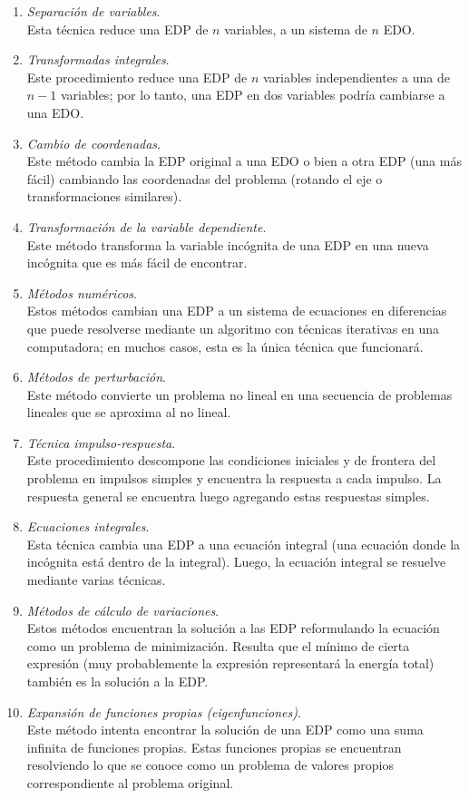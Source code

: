 \documentclass[12pt]{article}
\numberwithin{equation}{section}
\begin{document}
\begin{enumerate}
\item \emph{Separación de variables}.
\\
\bigskip
Esta técnica reduce una EDP de $n$ variables, a un sistema de $n$ EDO.
\item \emph{Transformadas integrales}. 
\\
\bigskip
Este procedimiento reduce una EDP de $n$ variables independientes a una de $n - 1$ variables; por lo tanto, una EDP en dos variables podría cambiarse a una EDO.
\item \emph{Cambio de coordenadas}.
\\
\bigskip
Este método cambia la EDP original a una EDO o bien a otra EDP (una más fácil) cambiando las coordenadas del problema (rotando el eje o transformaciones similares).
\item \emph{Transformación de la variable dependiente}.
\\
\bigskip
Este método transforma la variable incógnita de una EDP en una nueva incógnita que es más fácil de encontrar.
\item \emph{Métodos numéricos}. 
\\
\bigskip
Estos métodos cambian una EDP a un sistema de ecuaciones en diferencias que puede resolverse mediante un algoritmo con técnicas iterativas en una computadora; en muchos casos, esta es la única técnica que funcionará. 
\item \emph{Métodos de perturbación}.
\\
\bigskip
Este método convierte un problema no lineal en una secuencia de problemas lineales que se aproxima al no lineal.
\item \emph{Técnica impulso-respuesta}.
\\
\bigskip
Este procedimiento descompone las condiciones iniciales y de frontera del problema en impulsos simples y encuentra la respuesta a cada impulso. La respuesta general se encuentra luego agregando estas respuestas simples.
\item \emph{Ecuaciones integrales}. 
\\
\bigskip
Esta técnica cambia una EDP a una ecuación integral (una ecuación donde la incógnita está dentro de la integral). Luego, la ecuación integral se resuelve mediante varias técnicas.
\item \emph{Métodos de cálculo de variaciones}.
\\
\bigskip
Estos métodos encuentran la solución a las EDP reformulando la ecuación como un problema de minimización. Resulta que el mínimo de cierta expresión (muy probablemente la expresión representará la energía total) también es la solución a la EDP.
\item \emph{Expansión de funciones propias (eigenfunciones)}.
\\
\bigskip
Este método intenta encontrar la solución de una EDP como una suma infinita de funciones propias. Estas funciones propias se encuentran resolviendo lo que se conoce como un problema de valores propios correspondiente al problema original.
\end{enumerate}
\end{document}
